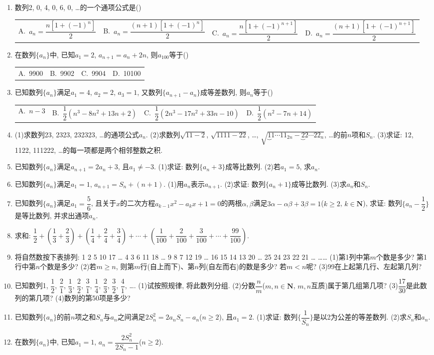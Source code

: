 \documentclass[10pt,a4paper]{article}
\newcommand{\fourch}[4]{\par\begin{tabular}{p{.23\textwidth}p{.23\textwidth}p{.23\textwidth}p{.23\textwidth}}
A.~#1 &B.~#2& C.~#3& D.~#4
\end{tabular}}
\begin{document}
\begin{enumerate}[1.]
\item 数列2, 0, 4, 0, 6, 0, …的一个通项公式是()
\fourch{$a_n=\dfrac{n[1+(-1)^n]}2$}{$a_n=\dfrac{(n+1)[1+(-1)^n]}2$}{$a_n=\dfrac{n[1+(-1)^{n+1}]}2$}{$a_n=\dfrac{(n+1)[1+(-1)^{n+1}]}2$}
\item 在数列$\{a_n\}$中, 已知$a_1=2$, $a_{n+1}=a_n+2n$, 则$a_{100}$等于()
\fourch{9900}{9902}{9904}{10100}
\item 已知数列$\{a_n\}$满足$a_1=4$, $a_2=2$, $a_3=1$, 又数列$\{a_{n+1}-a_n\}$成等差数列, 则$a_n$等于()
\fourch{$n-3$}{$\dfrac 12(n^3-8n^2+13n+2)$}{$\dfrac 12(2n^3-17n^2+33n-10)$}{$\dfrac 12(n^2-7n+14)$}
\item (1)求数列23, 2323, 232323, …的通项公式$a_n$.
(2)求数列$\sqrt {11-2}$, $\sqrt {1111-22}$, …, $\sqrt {\underbrace11\cdots 11_{2n}-\underbrace22\cdots 22_n}$, …的前$n$项和$S_n$.
(3)求证: 12, 1122, 111222, …的每一项都是两个相邻整数之积.
\item 已知数列$\{a_n\}$满足$a_{n+1}=2a_n+3$, 且$a_1\ne -3$.
(1)求证: 数列$\{a_n+3\}$成等比数列.
(2)若$a_1=5$, 求$a_n$.
\item 已知数列$\{a_n\}$满足$a_1=1$, $a_{n+1}=S_n+(n+1)$.
(1)用$a_n$表示$a_{n+1}$.
(2)求证: 数列$\{a_n+1\}$成等比数列.
(3)求$a_n$和$S_n$.
\item 已知数列$\{a_n\}$满足$a_1=\dfrac 56$, 且关于$x$的二次方程$a_{k-1}x^2-a_kx+1=0$的两根$\alpha ,\beta$满足$3\alpha -\alpha \beta +3\beta =1$($k\ge 2$, $k\in \mathbf{N}$), 求证: 数列$\{a_n-\dfrac 12\}$是等比数列, 并求出通项$a_n$.
\item 求和: $\dfrac 12+(\dfrac 13+\dfrac 23)+(\dfrac 14+\dfrac 24+\dfrac 34)+\cdots +(\dfrac 1{100}+\dfrac 2{100}+\dfrac 3{100}+\cdots +\dfrac{99}{100})$.
\item 将自然数按下表排列:
1	2	5	10	17	…
4	3	6	11	18	…
9	8	7	12	19	…
16	15	14	13	20	…
25	24	23	22	21	…
……					
(1)第1列中第$m$个数是多少? 第1行中第$n$个数是多少?
(2)若$m\ge n$, 则第$m$行(自上而下)、第$n$列(自左而右)的数是多少? 若$m<n$呢?
(3)99在上起第几行、左起第几列?
\item 已知数列1, $\dfrac 12$, $\dfrac 21$, $\dfrac 13$, $\dfrac 22$, $\dfrac 31$, $\dfrac 14$, $\dfrac 23$, $\dfrac 32$, $\dfrac 41$, ….
(1)试按照规律, 将此数列分组.
(2)分数$\dfrac nm$($m,n\in \mathbf{N}$, $m,n$互质)属于第几组第几项?
(3)$\dfrac{17}{30}$是此数列的第几项?
(4)数列的第50项是多少?
\item 已知数列$\{a_n\}$的前$n$项之和$S_n$与$a_n$之间满足$2S_n^2=2a_nS_n-a_n$($n\ge 2$), 且$a_1=2$.
(1)求证: 数列$\{\dfrac 1{S_n}\}$是以2为公差的等差数列.
(2)求$S_n$和$a_n$.
\item 在数列$\{a_n\}$中, 已知$a_1=1$, $a_n=\dfrac{2S_n^2}{2{S_n}-1}$($n\ge 2$).

\end{enumerate}
\end{document}
